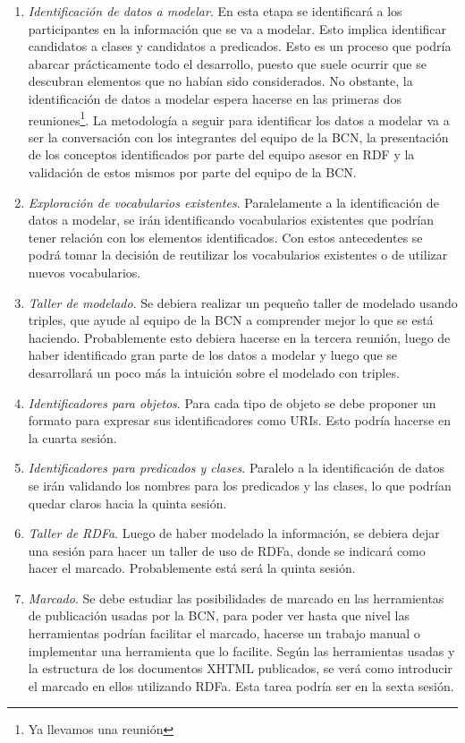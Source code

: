 \documentclass[letterpaper,titlepage]{article}
\begin{document}
\begin{enumerate}
\item {\em Identificación de datos a modelar}. En esta etapa se
  identificará a los participantes en la información que se va a
  modelar. Esto implica identificar candidatos a clases y candidatos a
  predicados. Esto es un proceso que podría abarcar prácticamente todo
  el desarrollo, puesto que suele ocurrir que se descubran elementos
  que no habían sido considerados. No obstante, la identificación de
  datos a modelar espera hacerse en las primeras dos
  reuniones\footnote{Ya llevamos una reunión}. La metodología a seguir
  para identificar los datos a modelar va a ser la conversación con
  los integrantes del equipo de la BCN, la presentación de los
  conceptos identificados por parte del equipo asesor en RDF y la
  validación de estos mismos por parte del equipo de la BCN.
\item {\em Exploración de vocabularios existentes}. Paralelamente a la
  identificación de datos a modelar, se irán identificando
  vocabularios existentes que podrían tener relación con los elementos
  identificados. Con estos antecedentes se podrá tomar la
  decisión de reutilizar los vocabularios existentes o de utilizar
  nuevos vocabularios.
\item {\em Taller de modelado}. Se debiera realizar un pequeño taller
  de modelado usando triples, que ayude al equipo de la BCN a
  comprender mejor lo que se está haciendo. Probablemente esto debiera
  hacerse en la tercera reunión, luego de haber identificado gran
  parte de los datos a modelar y luego que se desarrollará un poco más
  la intuición sobre el modelado con triples.
\item {\em Identificadores para objetos}. Para cada tipo de objeto se
  debe proponer un formato para expresar sus identificadores como
  URIs. Esto podría hacerse en la cuarta sesión.
\item {\em Identificadores para predicados y clases}. Paralelo a la
  identificación de datos se irán validando los nombres para los
  predicados y las clases, lo que podrían quedar claros hacia la
  quinta sesión.
\item {\em Taller de RDFa}. Luego de haber modelado la
  información, se debiera dejar una sesión para hacer un taller de uso
  de RDFa, donde se indicará como hacer el marcado. Probablemente está
  será la quinta sesión.
\item {\em Marcado}. Se debe estudiar las posibilidades de marcado en
  las herramientas de publicación usadas por la BCN, para poder ver
  hasta que nivel las herramientas podrían facilitar el marcado,
  hacerse un trabajo manual o implementar una herramienta que lo
  facilite. Según las herramientas usadas y la estructura de los
  documentos XHTML publicados, se verá como introducir el marcado en
  ellos utilizando RDFa. Esta tarea podría ser en la sexta sesión.
\end{enumerate}
\end{document}
